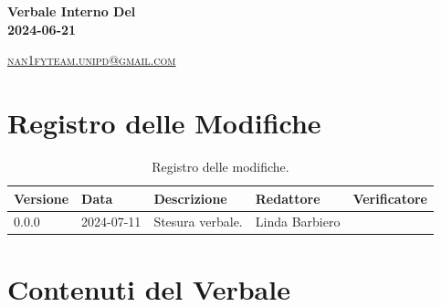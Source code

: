 \documentclass[8pt]{article}
\begin{document}
\begin{titlepage}
\begin{minipage}[t]{0.47\textwidth}
{		}
		\vspace{4mm}\vspace{4mm}
	\end{minipage}
	\vspace{4cm}
	\begin{center}
		\begin{flushright}
			{\fontsize{30pt}{52pt}\selectfont \textbf{Verbale Interno Del\\2024-06-21\\}} %
		\end{flushright}
		\vspace{3cm}
	\end{center}
	\vspace{8.5 cm}
	{\small \textsc{\href{mailto: nan1fyteam.unipd@gmail.com}{nan1fyteam.unipd@gmail.com}}}
\end{titlepage}
\pagestyle{mystyle}
\section*{Registro delle Modifiche}
\begin{table}[ht!]	
	\centering
	\begin{tabular}{p{1.2cm} p{2cm} p{5cm} p{3cm} p{3cm}}
		\toprule
		\textbf{Versione}& \textbf{Data} & \textbf{Descrizione} & \textbf{Redattore} & \textbf{Verificatore} \\
		\midrule
			0.0.0 & 2024-07-11 & Stesura verbale. & Linda Barbiero & 
 			\\ %

		\bottomrule
	\end{tabular}
	\caption{Registro delle modifiche.}
	\label{table:Registro delle modifiche}
\end{table}
\newpage
\tableofcontents
\clearpage
\newpage
\justifying
\section{Contenuti del Verbale}
\end{document}
